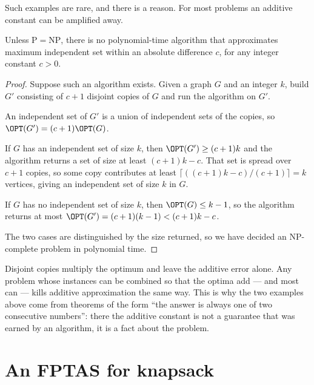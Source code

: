 Such examples are rare, and there is a reason. For most problems an additive
constant can be amplified away.

\begin{theorem}\label{thm:no-additive-is}
Unless $\mathrm{P} = \mathrm{NP}$, there is no polynomial-time algorithm that
approximates maximum independent set within an absolute difference $c$, for any
integer constant $c > 0$.
\end{theorem}

\begin{proof}
Suppose such an algorithm exists. Given a graph $G$ and an integer $k$, build
$G'$ consisting of $c+1$ disjoint copies of $G$ and run the algorithm on $G'$.

An independent set of $G'$ is a union of independent sets of the copies, so
$\OPT(G') = (c+1)\OPT(G)$.

If $G$ has an independent set of size $k$, then $\OPT(G') \ge (c+1)k$ and the
algorithm returns a set of size at least $(c+1)k - c$. That set is spread over
$c+1$ copies, so some copy contributes at least
$\lceil ((c+1)k-c)/(c+1) \rceil = k$ vertices, giving an independent set of size
$k$ in $G$.

If $G$ has no independent set of size $k$, then $\OPT(G) \le k-1$, so the
algorithm returns at most $\OPT(G') = (c+1)(k-1) < (c+1)k - c$.

The two cases are distinguished by the size returned, so we have decided an
\textrm{NP}-complete problem in polynomial time.
\end{proof}

\begin{intuition}
Disjoint copies multiply the optimum and leave the additive error alone. Any
problem whose instances can be combined so that the optima add --- and most can
--- kills additive approximation the same way. This is why the two examples
above come from theorems of the form ``the answer is always one of two
consecutive numbers'': there the additive constant is not a guarantee that was
earned by an algorithm, it is a fact about the problem.
\end{intuition}

\section{An FPTAS for knapsack}
\label{sec:knapsack-fptas}

